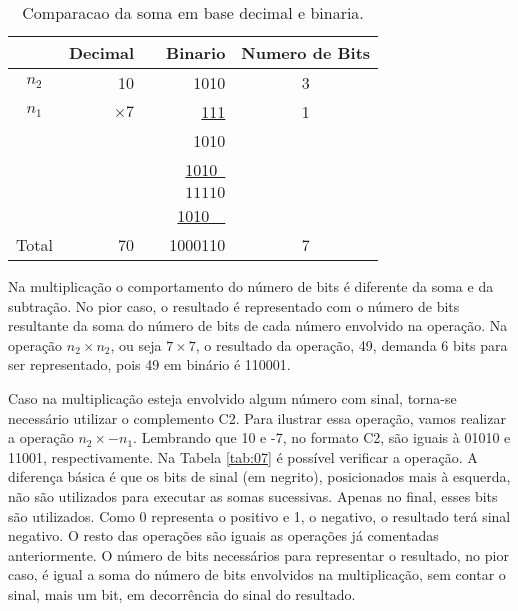 \documentclass[12pt]{article}
\begin{document}
\begin{table}[ht]
	\centering
    \caption{Comparacao da soma em base decimal e binaria.}
    \begin{tabular}{crrrc}
    \hline
    	  & Decimal & & Binario & Numero de Bits \\
    \hline      
    $n_2$ & 10	& & 1010 & 3 \\
    $n_1$ & \underline{$\times 7$} & & \underline{111} & 1 \\
    & & & 1010  & \\
    & & & \underline{1010\ } & \\
    & & & $11110$ & \\
    & & & \underline{1010\ \ } & \\
    Total& 70 & & 1000110 & 7\\
    \hline
	\end{tabular}
    \label{tab:06}
\end{table}

Na multiplicação o comportamento do número de bits é diferente da soma e da
subtração. No pior caso, o resultado é representado com o número de bits
resultante da soma do número de bits de cada número envolvido na operação. Na
operação $n_2 \times n_2$, ou seja $7 \times 7$, o resultado da operação, 49,
demanda 6 bits para ser representado, pois 49 em binário é 110001.

Caso na multiplicação esteja envolvido algum número com sinal, torna-se
necessário utilizar o complemento C2. Para ilustrar essa operação, vamos
realizar a operação $n_2 \times -n_1$. Lembrando que 10 e -7, no formato C2, são
 iguais à 01010 e 11001, respectivamente. Na Tabela \ref{tab:07} é possível
verificar a operação. A diferença básica é que os bits de sinal (em negrito),
posicionados mais à esquerda, não são utilizados para executar as somas
sucessivas. Apenas no final, esses bits são utilizados. Como 0 representa o
positivo e 1, o negativo, o resultado terá sinal negativo. O resto das operações
são iguais as operações já comentadas anteriormente. O número de bits
necessários para representar o resultado, no pior caso, é igual a soma do número
de bits envolvidos na multiplicação, sem contar o sinal, mais um bit, em
decorrência do sinal do resultado.
\end{document}
